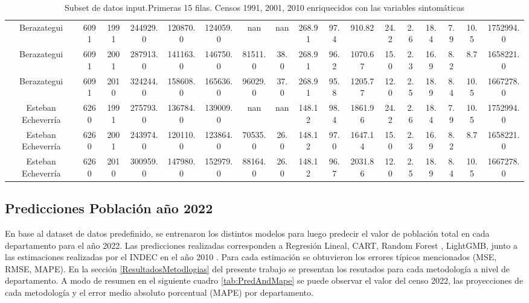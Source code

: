 \documentclass{article}
\theoremstyle{mytheoremstyle}
\theoremstyle{mytheoremstyle}
\theoremstyle{myproblemstyle}
\begin{document}
{\begin{landscape}
\begin{table}[htb]
\begin{tabular}{|c|c|c|c|c|c|c|c|c|c|c|c|c|c|c|c|c|}
        Berazategui & 6091 & 1991 & 244929.0 & 120870.0 & 124059.0 & nan & nan & 268.91 & 97.4 & 910.82 & 24.2 & 2.6 & 18.4 & 7.9 & 10.5 & 1752994.0 \\
        Berazategui & 6091 & 2001 & 287913.0 & 141163.0 & 146750.0 & 81511.0 & 38.0 & 268.91 & 96.2 & 1070.67 & 15.0 & 2.3 & 16.9 & 8.2 & 8.7 & 1658221.0 \\
        Berazategui & 6091 & 2010 & 324244.0 & 158608.0 & 165636.0 & 96029.0 & 37.0 & 268.91 & 95.8 & 1205.77 & 12.0 & 2.5 & 18.9 & 8.4 & 10.5 & 1667278.0 \\
        Esteban Echeverría & 6260 & 1991 & 275793.0 & 136784.0 & 139009.0 & nan & nan & 148.12 & 98.4 & 1861.96 & 24.2 & 2.6 & 18.4 & 7.9 & 10.5 & 1752994.0 \\
        Esteban Echeverría & 6260 & 2001 & 243974.0 & 120110.0 & 123864.0 & 70535.0 & 26.0 & 148.12 & 97.0 & 1647.14 & 15.0 & 2.3 & 16.9 & 8.2 & 8.7 & 1658221.0 \\
        Esteban Echeverría & 6260 & 2010 & 300959.0 & 147980.0 & 152979.0 & 88164.0 & 26.0 & 148.12 & 96.7 & 2031.86 & 12.0 & 2.5 & 18.9 & 8.4 & 10.5 & 1667278.0 \\
        \hline
      \end{tabular}
      \caption{Subset de datos input.Primeras 15 filas. Censos 1991, 2001, 2010 enriquecidos con las variables sintomáticas}
    \label{tab:baseModelos}
    \end{table}
    \end{landscape}
 }

 \subsection{Predicciones Población año 2022}

 En base al dataset de datos predefinido, se entrenaron los distintos modelos para luego predecir el valor de población total en cada
 departamento para el año 2022. Las predicciones realizadas corresponden a  Regresión Lineal, CART, Random Forest , LightGMB, junto a las 
estimaciones realizadas por el INDEC en el año 2010 . Para cada estimación se obtuvieron los errores 
 típicos mencionados (MSE, RMSE, MAPE). En la sección \ref{ResultadosMetodlogias} del presente trabajo se presentan 
 los resutados para cada metodología a nivel de departamento.
 A modo de resumen en el siguiente cuadro \ref{tab:PredAndMape} se puede observar el valor del censo 2022,
  las proyecciones de cada metodología y el error medio absoluto porcentual (MAPE) por departamento.\newline
\end{document}
